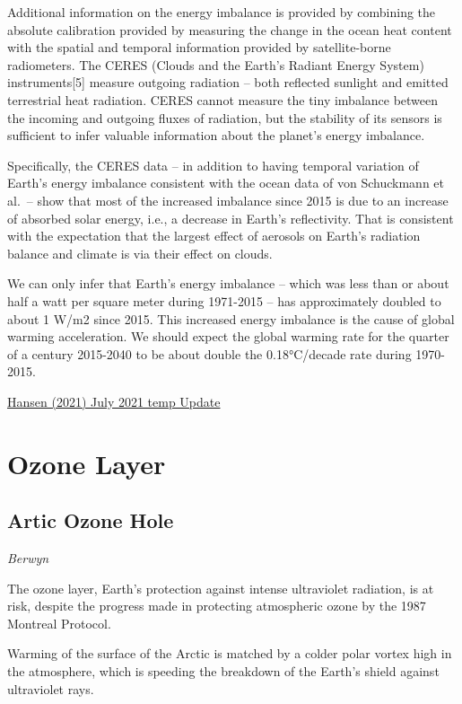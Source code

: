 \documentclass[
]{book}
\begin{document}
Additional information on the energy imbalance is provided by combining the absolute calibration provided by measuring the change in the ocean heat content with the spatial and temporal information provided by satellite-borne radiometers. The CERES (Clouds and the Earth's Radiant Energy System) instruments{[}5{]} measure outgoing radiation -- both reflected sunlight and emitted terrestrial heat radiation. CERES cannot measure the tiny imbalance between the incoming and outgoing fluxes of radiation, but the stability of its sensors is sufficient to infer valuable information about the planet's energy imbalance.

Specifically, the CERES data -- in addition to having temporal variation of Earth's energy imbalance consistent with the ocean data of von Schuckmann et al.~-- show that most of the increased imbalance since 2015 is due to an increase of absorbed solar energy, i.e., a decrease in Earth's reflectivity. That is consistent with the expectation that the largest effect of aerosols on Earth's radiation balance and climate is via their effect on clouds.

We can only infer that Earth's energy imbalance -- which was less than or about half a watt per square meter during 1971-2015 -- has approximately doubled to about 1 W/m2 since 2015. This increased energy imbalance is the cause of global warming acceleration. We should expect the global warming rate for the quarter of a century 2015-2040 to be about double the 0.18°C/decade rate during 1970-2015.

\href{https://mailchi.mp/caa/july-temperature-update-faustian-payment-comes-due?e=96d59a909f}{Hansen (2021) July 2021 temp Update}

\hypertarget{ozone-layer}{%
\section{Ozone Layer}\label{ozone-layer}}

\hypertarget{artic-ozone-hole}{%
\subsection{Artic Ozone Hole}\label{artic-ozone-hole}}

\emph{Berwyn}

The ozone layer, Earth's protection against intense ultraviolet radiation, is at risk, despite the progress made in protecting atmospheric ozone by the 1987 Montreal Protocol.

Warming of the surface of the Arctic is matched by a colder polar vortex high in the atmosphere, which is speeding the breakdown of the Earth's shield against ultraviolet rays.
\end{document}
